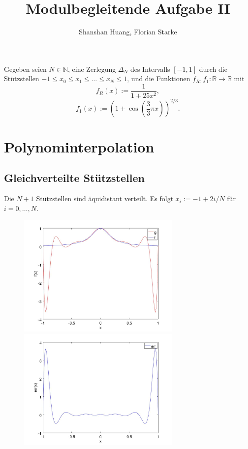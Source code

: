\documentclass[]{scrartcl}
\title{Modulbegleitende Aufgabe II}
\author{Shanshan Huang, Florian Starke}
\newcommand{\R}{\mathbb{R}}
\newcommand{\N}{\mathbb{N}}
\begin{document}
	\maketitle
	Gegeben seien $N\in\N$, eine Zerlegung $\Delta_N$ des Intervalls $[-1,1]$ durch die Stützstellen $-1\leq x_0\leq x_1\leq\dots\leq x_N\leq1$, und die Funktionen $f_R,f_1\colon\R\to\R$ mit
	\[f_R(x):=\frac{1}{1+25x^2},\]
	\[f_1(x):=(1+\cos(\frac{3}{3}\pi x))^{2/3}.\]
	\section{Polynominterpolation}
	\subsection{Gleichverteilte Stützstellen}
	Die $N+1$ Stützstellen sind äquidistant verteilt. Es folgt $x_i:=-1+2i/N$ für $i=0,\dots,N$.
	\begin{figure}[h]
		\centering
		\begin{minipage}{0.5\textwidth}
			\includegraphics[width=8cm,keepaspectratio]{runge_aequidistant}
			\caption{\label{Abb.1}}
		\end{minipage}
		\begin{minipage}{0.49\textwidth}
			\includegraphics[width=8cm,keepaspectratio]{runge_err}
			\caption{\label{Abb.2}}
		\end{minipage}
	\end{figure}
	
\end{document}
